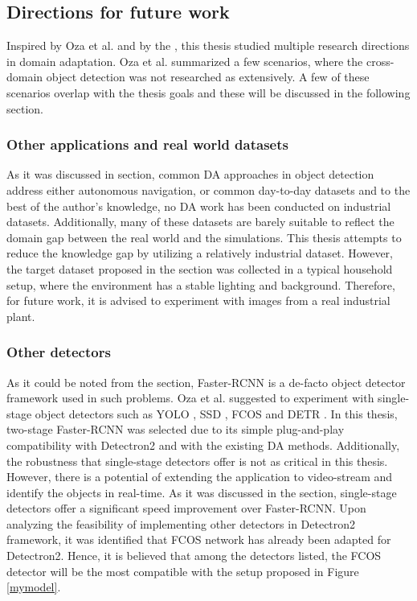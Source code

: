 \documentclass[english, 12pt, a4paper, elec, utf8, a-1b, online]{aaltothesis}
\begin{document}
\subsection{Directions for future work}
Inspired by Oza et al. \cite{Oza2021} and by the , this thesis studied multiple research directions in domain adaptation. Oza et al. summarized a few scenarios, where the cross-domain object detection was not researched as extensively. A few of these scenarios overlap with the thesis goals and these will be discussed in the following section. 

\subsubsection{Other applications and real world datasets}
As it was discussed in  section, common DA approaches in object detection address either autonomous navigation, or common day-to-day datasets and to the best of the author's knowledge, no DA work has been conducted on  industrial datasets. Additionally, many of these datasets are barely suitable to reflect the domain gap between the real world and the simulations. This thesis attempts to reduce the knowledge gap by utilizing a relatively industrial dataset. However, the target dataset proposed in the  section was collected in a typical household setup, where the environment has a stable lighting and background. Therefore, for future work, it is advised to experiment with images from a real industrial plant.  

\subsubsection{Other detectors}
As it could be noted from the  section, Faster-RCNN is a de-facto object detector framework used in such problems. Oza et al. \cite{Oza2021} suggested to experiment with single-stage object detectors such as YOLO \cite{Redmon2015a}, SSD \cite{Liu2015}, FCOS \cite{Tian2019} and DETR \cite{Carion2020}. In this thesis, two-stage Faster-RCNN was selected due to its simple plug-and-play compatibility with Detectron2 \cite{wu2019Detectron2} and with the existing DA methods. Additionally, the robustness that single-stage detectors offer is not as critical in this thesis. However, there is a potential of extending the application to video-stream and identify the objects in real-time. As it was discussed in the  section, single-stage detectors offer a significant speed improvement over Faster-RCNN. Upon analyzing the feasibility of implementing other detectors in Detectron2 \cite{wu2019Detectron2} framework, it was identified that FCOS network has already been adapted for Detectron2. Hence, it is believed that among the detectors listed, the FCOS detector will be the most compatible with the setup proposed in Figure \ref{mymodel}. 
\end{document}

